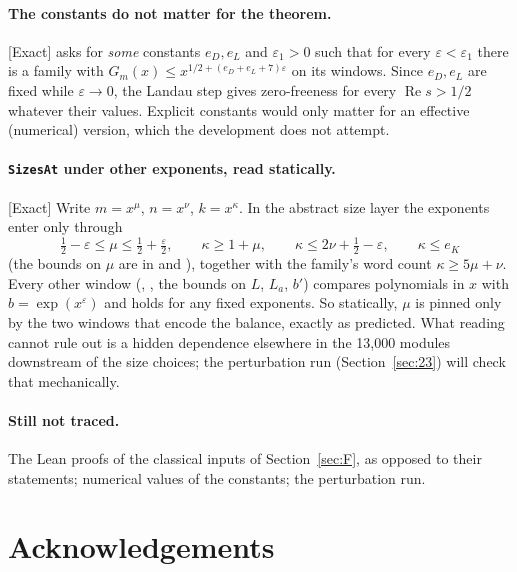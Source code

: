 \documentclass[11pt]{article}
\newcommand{\Exact}{\textcolor{exactc}{\textsf{\small[Exact]}}}
\newcommand{\eps}{\varepsilon}
\newcommand{\re}{\operatorname{Re}}
\theoremstyle{plain}
\theoremstyle{definition}
\begin{document}
\paragraph{The constants do not matter for the theorem.} \Exact{}
 asks for \emph{some} constants $e_D,e_L$ and $\eps_1>0$
such that for every $\eps<\eps_1$ there is a family with $G_m(x)\le x^{1/2+(e_D+e_L+7)\eps}$ on its
windows. Since $e_D,e_L$ are fixed while $\eps\to0$, the Landau step gives zero-freeness for every
$\re s>1/2$ whatever their values. Explicit constants would only matter for an effective
(numerical) version, which the development does not attempt.

\paragraph{\texttt{SizesAt} under other exponents, read statically.} \Exact{} Write $m=x^\mu$,
$n=x^\nu$, $k=x^\kappa$. In the abstract size layer the exponents enter only through
\[
\tfrac12-\eps\le\mu\le\tfrac12+\tfrac\eps2,\qquad
\kappa\ge1+\mu,\qquad \kappa\le 2\nu+\tfrac12-\eps,\qquad \kappa\le e_K
\]
(the bounds on $\mu$ are in  and ), together with the family's word count $\kappa\ge5\mu+\nu$. Every other window
(, , the bounds on $L$, $L_a$, $b'$) compares
polynomials in $x$ with $b=\exp(x^\eps)$ and holds for any fixed exponents. So statically, $\mu$ is
pinned only by the two windows that encode the balance, exactly as predicted. What reading cannot
rule out is a hidden dependence elsewhere in the 13{,}000 modules downstream of the size choices;
the perturbation run (Section~\ref{sec:23}) will check that mechanically.

\paragraph{Still not traced.} The Lean proofs of the classical inputs of Section~\ref{sec:F}, as
opposed to their statements; numerical values of the constants; the perturbation run.

\section*{Acknowledgements}
\end{document}
